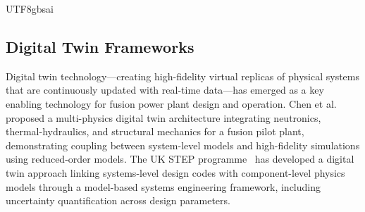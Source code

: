 \documentclass[12pt,a4paper]{article}
\begin{document}
\begin{CJK}{UTF8}{gbsai}
\subsection{Digital Twin Frameworks}

Digital twin technology---creating high-fidelity virtual replicas of physical systems that are continuously updated with real-time data---has emerged as a key enabling technology for fusion power plant design and operation. Chen et al.~\citep{Chen2024DT} proposed a multi-physics digital twin architecture integrating neutronics, thermal-hydraulics, and structural mechanics for a fusion pilot plant, demonstrating coupling between system-level models and high-fidelity simulations using reduced-order models. The UK STEP programme~\citep{Kemp2024STEP} has developed a digital twin approach linking systems-level design codes with component-level physics models through a model-based systems engineering framework, including uncertainty quantification across design parameters.


\end{CJK}
\end{document}
